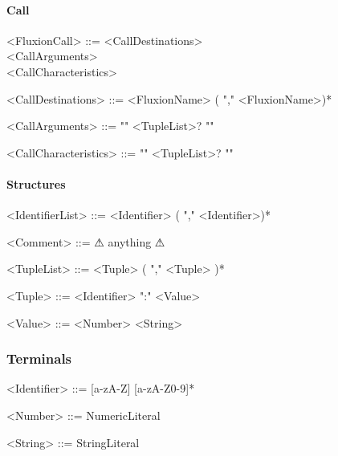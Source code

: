 \paragraph{Call}

\begin{grammar}

<FluxionCall>         ::= <CallDestinations>\\
                          <CallArguments>\\
                          <CallCharacteristics>

<CallDestinations>    ::= <FluxionName> ( "," <FluxionName>)*

<CallArguments>       ::= "{" <TupleList>? "}"

<CallCharacteristics> ::= "{" <TupleList>? "}"

\end{grammar}

\paragraph{Structures}

\begin{grammar}

<IdentifierList>      ::= <Identifier> ( "," <Identifier>)*

<Comment>             ::= $\warning$ anything $\warning$

<TupleList>           ::= <Tuple> ( "," <Tuple> )*

<Tuple>               ::= <Identifier> ":" <Value>

<Value>               ::= <Number>
                     \alt <String>
\end{grammar}

\subsubsection{Terminals}

\begin{grammar}

<Identifier>          ::= [a-zA-Z] [a-zA-Z0-9]*

<Number>              ::= NumericLiteral

<String>              ::= StringLiteral

\end{grammar}